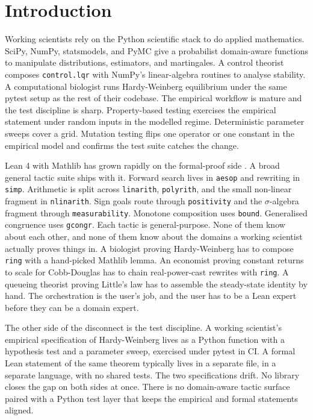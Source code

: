 \section{Introduction}
\label{sec:intro}

Working scientists rely on the Python scientific stack to do
applied mathematics. SciPy, NumPy, statsmodels, and PyMC give a
probabilist domain-aware functions to manipulate distributions,
estimators, and martingales. A control theorist composes
\texttt{control.lqr} with NumPy's linear-algebra routines to
analyse stability. A computational biologist runs Hardy-Weinberg
equilibrium under the same pytest setup as the rest of their
codebase. The empirical workflow is mature and the test
discipline is sharp. Property-based testing exercises the
empirical statement under random inputs in the modelled regime.
Deterministic parameter sweeps cover a grid. Mutation testing
flips one operator or one constant in the empirical model and
confirms the test suite catches the change.

Lean 4 with Mathlib has grown rapidly on the formal-proof side
\citep{moura2021lean, mathlib2020community, mathlib2025}. A
broad general tactic suite ships with it. Forward search lives in
\texttt{aesop} and rewriting in \texttt{simp}. Arithmetic is
split across \texttt{linarith}, \texttt{polyrith}, and the
small non-linear fragment in \texttt{nlinarith}. Sign goals
route through \texttt{positivity} and the $\sigma$-algebra
fragment through \texttt{measurability}. Monotone composition
uses \texttt{bound}. Generalised congruence uses \texttt{gcongr}. Each tactic is general-purpose. None of
them know about each other, and none of them know about the
domains a working scientist actually proves things in. A
biologist proving Hardy-Weinberg has to compose \texttt{ring}
with a hand-picked Mathlib lemma. An economist proving constant
returns to scale for Cobb-Douglas has to chain real-power-cast
rewrites with \texttt{ring}. A queueing theorist proving
Little's law has to assemble the steady-state identity by hand. The orchestration is the user's
job, and the user has to be a Lean expert before they can be a
domain expert.

The other side of the disconnect is the test discipline. A
working scientist's empirical specification of Hardy-Weinberg
lives as a Python function with a hypothesis test and a
parameter sweep, exercised under pytest in CI. A formal Lean
statement of the same theorem typically lives in a separate
file, in a separate language, with no shared tests. The two
specifications drift. No library closes the gap on both sides
at once. There is no domain-aware tactic surface paired with a
Python test layer that keeps the empirical and formal
statements aligned.


